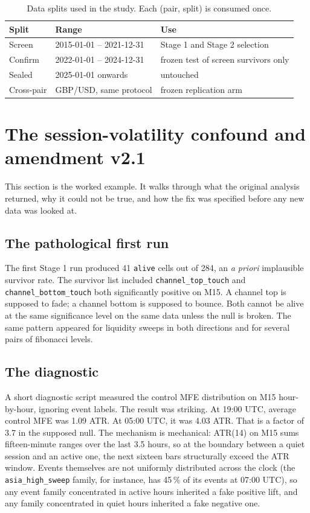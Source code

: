 \documentclass[11pt,a4paper]{article}
\begin{document}
\begin{table}[h]
\centering
\caption{Data splits used in the study. Each (pair, split) is consumed
once.}
\label{tab:splits}
\begin{tabular}{lll}
\toprule
Split & Range & Use \\
\midrule
Screen & 2015-01-01 -- 2021-12-31 & Stage 1 and Stage 2 selection \\
Confirm & 2022-01-01 -- 2024-12-31 & frozen test of screen survivors only \\
Sealed & 2025-01-01 onwards & untouched \\
Cross-pair & GBP/USD, same protocol & frozen replication arm \\
\bottomrule
\end{tabular}
\end{table}

\section{The session-volatility confound and amendment v2.1}\label{sec:confound}

This section is the worked example. It walks through what the original
analysis returned, why it could not be true, and how the fix was
specified before any new data was looked at.

\subsection{The pathological first run}

The first Stage 1 run produced 41 \texttt{alive} cells out of 284, an
\emph{a priori} implausible survivor rate. The survivor list included
\texttt{channel\_top\_touch} and \texttt{channel\_bottom\_touch} both
significantly positive on M15. A channel top is supposed to fade; a
channel bottom is supposed to bounce. Both cannot be alive at the same
significance level on the same data unless the null is broken. The
same pattern appeared for liquidity sweeps in both directions and for
several pairs of fibonacci levels.

\subsection{The diagnostic}

A short diagnostic script measured the control MFE distribution on M15
hour-by-hour, ignoring event labels. The result was striking. At 19:00
UTC, average control MFE was 1.09 ATR. At 05:00 UTC, it was 4.03 ATR.
That is a factor of 3.7 in the supposed null. The mechanism is
mechanical: ATR(14) on M15 sums fifteen-minute ranges over the last 3.5
hours, so at the boundary between a quiet session and an active one,
the next sixteen bars structurally exceed the ATR window. Events
themselves are not uniformly distributed across the clock (the
\texttt{asia\_high\_sweep} family, for instance, has 45\,\% of its
events at 07:00 UTC), so any event family concentrated in active hours
inherited a fake positive lift, and any family concentrated in quiet
hours inherited a fake negative one.
\end{document}
